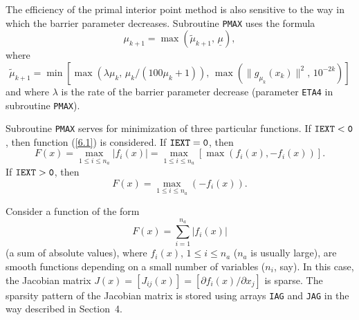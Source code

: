 \documentclass{esub2acm}
\newcommand{\be}{\begin{equation}}
\newcommand{\ee}{\end{equation}}
\newcommand{\bd}{\begin{displaymath}}
\newcommand{\ed}{\end{displaymath}}
\begin{document}
The efficiency of the primal interior point method is also sensitive
to the way in which the barrier parameter decreases. Subroutine
{\tt PMAX} uses the formula
%
$$\mu_{k+1} = \max\left(\tilde{\mu}_{k+1}, \, \underline{\mu}\right),$$
%
where
%
$$\tilde{\mu}_{k+1} = \min\left[\max(\lambda \mu_k, \, \mu_k /
(100 \mu_k + 1)), \, \max(\|g_{\mu_k}(x_k)\|^2, \, 10^{-2k})\right]$$
%
and where $\lambda$ is the rate of the barrier parameter
decrease (parameter {\tt ETA4} in subroutine {\tt PMAX}).

Subroutine {\tt PMAX} serves for minimization of three particular
functions. If ${\tt IEXT<0}$, then function (\ref{6.1}) is considered.
If ${\tt IEXT=0}$, then
%
\bd
\label{6.5}
F(x) = \max_{1 \leq i \leq n_a} |f_i(x)| = \max_{1 \leq i \leq n_a}
\left[ \max(f_i(x), -f_i(x)) \right].
\ed
%
If ${\tt IEXT>0}$, then
%
\bd
\label{6.6}
F(x) = \max_{1 \leq i \leq n_a} (-f_i(x)).
\ed

\vspace{8mm}


\vspace{3mm}

\noindent Consider a function of the form
%
\be
\label{7.1}
F(x) = \sum_{i=1}^{n_a} |f_i(x)|
\ee
%
(a sum of absolute values), where $f_i(x)$, $1 \leq i \leq n_a$ ($n_a$ is usually large),
are smooth functions depending on a small number of variables ($n_i$, say). In this
case, the Jacobian matrix $J(x) = [J_{ij}(x)] = [\partial f_i(x)/\partial x_j]$
is sparse. The sparsity pattern of the Jacobian matrix is stored using arrays
{\tt IAG} and {\tt JAG} in the way described in Section~4.
\end{document}
